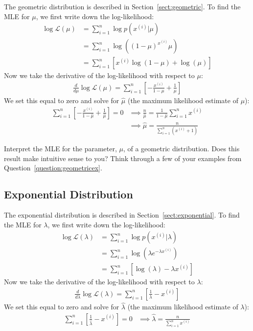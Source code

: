 The geometric distribution is described in Section~\ref{sect:geometric}. To find the MLE for $\mu$, we first write down the log-likelihood:
\begin{align*}
\log \mathcal{L}(\mu) &= \sum_{i=1}^n \log p(x^{(i)}|\mu) \\
&= \sum_{i=1}^n \log \left( (1-\mu)^{x^{(i)}} \mu \right) \\
&= \sum_{i=1}^n \left[ x^{(i)} \log(1-\mu) + \log(\mu) \right] \end{align*}
Now we take the derivative of the log-likelihood with respect to $\mu$:
\begin{align*}
\frac{d}{d \mu} \log \mathcal{L}(\mu) = \sum_{i=1}^n \left[ -\frac{x^{(i)}}{1-\mu} + \frac{1}{\mu} \right]
\end{align*}
We set this equal to zero and solve for $\hat{\mu}$ (the maximum likelihood estimate of $\mu$):
\begin{align*} \sum_{i=1}^n \left[ -\frac{x^{(i)}}{1-\hat{\mu}} + \frac{1}{\hat{\mu}} \right] = 0 & \implies \frac{n}{\hat{\mu}} = \frac{1}{1 - \hat{\mu}} \sum_{i=1}^n x^{(i)} \\
& \implies \boxed{\hat{\mu} = \frac{n}{\sum_{i=1}^n (x^{(i)}+1)} }\end{align*}

\begin{question}{}
Interpret the MLE for the parameter, $\mu$, of a geometric distribution. Does this result make intuitive sense to you? Think through a few of your examples from Question~\ref{question:geometricex}. 
\end{question}

\subsection{Exponential Distribution}

The exponential distribution is described in Section~\ref{sect:exponential}. To find the MLE for $\lambda$, we first write down the log-likelihood:
\begin{align*}
\log \mathcal{L}(\lambda) &= \sum_{i=1}^n \log p(x^{(i)}|\lambda) \\
&= \sum_{i=1}^n \log \left( \lambda e^{-\lambda x^{(i)}} \right) \\
&= \sum_{i=1}^n \left[\log(\lambda) - \lambda x^{(i)} \right] \end{align*}
Now we take the derivative of the log-likelihood with respect to $\lambda$:
\begin{align*}
\frac{d}{d \lambda} \log \mathcal{L}(\lambda) = \sum_{i=1}^n \left[ \frac{1}{\lambda} - x^{(i)} \right]
\end{align*}
We set this equal to zero and solve for $\hat{\lambda}$ (the maximum likelihood estimate of $\lambda$):
\begin{align*} \sum_{i=1}^n \left[ \frac{1}{\hat{\lambda}} - x^{(i)} \right] = 0 & \implies \boxed{\hat{\lambda} = \frac{n}{\sum_{i=1}^n x^{(i)}}} \end{align*}

